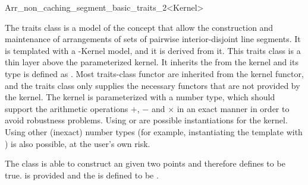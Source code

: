 
\ccRefPageBegin

\begin{ccRefClass}{Arr_non_caching_segment_basic_traits_2<Kernel>}
    
\ccDefinition 

The traits class \ccRefName{} is a model of the 
concept that allow the construction and maintenance of arrangements of
sets of pairwise interior-disjoint line segments. It is templated with a
\cgal-Kernel model, and it is derived from it. This traits class is a
thin layer above the parameterized kernel. It inherits the 
from the kernel and its  type is defined as
. Most traits-class functor are inherited from the
kernel functor, and the traits class only supplies the necessary functors
that are not provided by the kernel. The kernel is parameterized with a
number type, which should support the arithmetic operations $+$, $-$ and
$\times$ in an exact manner in order to avoid robustness problems.
Using  or  are possible
instantiations for the kernel. Using other (inexact) number types
(for example, instantiating the template with
) is also possible, at the user's own
risk.

The class is able to construct an  given two
points and therefore
defines  to be true.
 is provided and the 
is defined to be .



 
\ccIsModel

\end{ccRefClass}
\ccRefPageEnd
